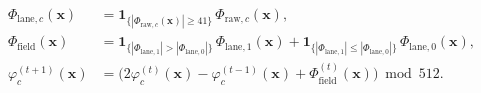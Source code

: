 \begin{enumerate}[label=\textbf{\arabic*.},leftmargin=*]
\begin{align}
    \Phi_{\mathrm{lane},c}(\mathbf{x}) &= \mathbf{1}_{\{|\Phi_{\mathrm{raw},c}(\mathbf{x})| \ge 41\}}\,\Phi_{\mathrm{raw},c}(\mathbf{x}), \label{eq:mono-field-philane} \\
    \Phi_{\mathrm{field}}(\mathbf{x}) &= \mathbf{1}_{\{|\Phi_{\mathrm{lane},1}| > |\Phi_{\mathrm{lane},0}|\}}\,\Phi_{\mathrm{lane},1}(\mathbf{x}) + \mathbf{1}_{\{|\Phi_{\mathrm{lane},1}| \le |\Phi_{\mathrm{lane},0}|\}}\,\Phi_{\mathrm{lane},0}(\mathbf{x}), \label{eq:mono-field-phifield} \\
    \varphi_c^{(t+1)}(\mathbf{x}) &= \bigl(2\varphi_c^{(t)}(\mathbf{x}) - \varphi_c^{(t-1)}(\mathbf{x}) + \Phi_{\mathrm{field}}^{(t)}(\mathbf{x})\bigr) \bmod 512. \label{eq:mono-field-step-g3}
  \end{align}
\end{enumerate}

